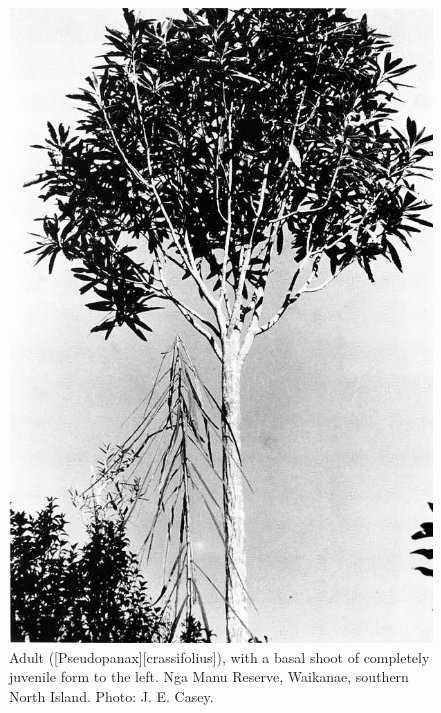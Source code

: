 \begin{figure}[!b]
	\begin{minipage}[t]{\textwidth}
		\begin{minipage}[t]{(\textwidth-\fgap) * \real{0.498}}
			\centering
			\includegraphics[width=\textwidth]{graphics/fig_020}
			\caption[Adult lancewood]{Adult  ([Pseudopanax][crassifolius]), with a basal shoot of completely juvenile form to the left.
			Nga Manu Reserve, Waikanae, southern North Island.
			Photo: J. E. Casey.}%
			\label{fig:20lancewood}
		\end{minipage}\hspace{\fgap}%
		\begin{minipage}[t]{(\textwidth-\fgap) * \real{0.502}}

\end{minipage}
\end{minipage}
\end{figure}
